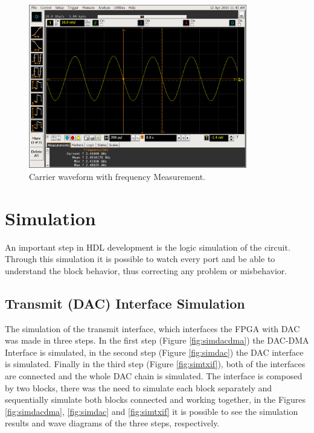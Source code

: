 \begin{figure}[htbp]
    \centering
    \includegraphics[width=0.85\textwidth,
    trim={{.17\textwidth} 0 {.02\textwidth} {.24\textwidth}},
    clip]{./figures/oscill_freq}
    \caption{ Carrier waveform with frequency Measurement.
    \label{fig:oscillfreq}}
\end{figure}

%


\section{Simulation}

An important step in HDL development is the logic simulation of the circuit.
Through this simulation it is possible to watch every port and be able to
understand the block behavior, thus correcting any problem or misbehavior.

\subsection{Transmit (DAC) Interface Simulation}

The simulation of the transmit interface, which interfaces the FPGA with DAC was
made in three steps. In the first step (Figure \ref{fig:simdacdma}) the DAC-DMA
Interface is simulated, in the second step (Figure \ref{fig:simdac}) the DAC
interface is simulated. Finally in the third step (Figure \ref{fig:simtxif}),
both of the interfaces are connected and the whole DAC chain is simulated. The
interface is composed by two blocks, there was the need to simulate each block
separately and sequentially simulate both blocks connected and working together,
in the Figures \ref{fig:simdacdma}, \ref{fig:simdac} and \ref{fig:simtxif} it is
possible to see the simulation results and wave diagrams of the three steps,
respectively.

